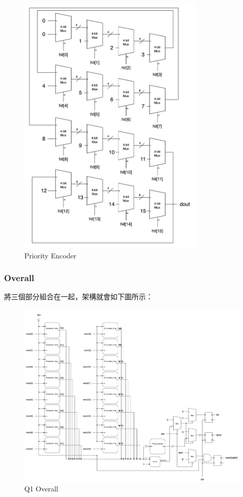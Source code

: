 \documentclass[10.5pt,compsoc,UTF8]{CjC}
\theoremstyle{mystyle}
\begin{document}
\begin{figure}[h!]
  \centering
  \includegraphics[width=0.8\textwidth]{./img/Q1-PE.png}
  \caption{Priority Encoder}
  \label{fig:PE}
\end{figure}
\newpage

\subsubsection*{Overall}

將三個部分組合在一起，架構就會如下圖所示：
\begin{figure}[h!]
  \centering
  \includegraphics[width=\textwidth]{./img/Q1.png}
  \caption{Q1 Overall}
  \label{fig:Q1-Overall}
\end{figure}
\newpage
\end{document}
